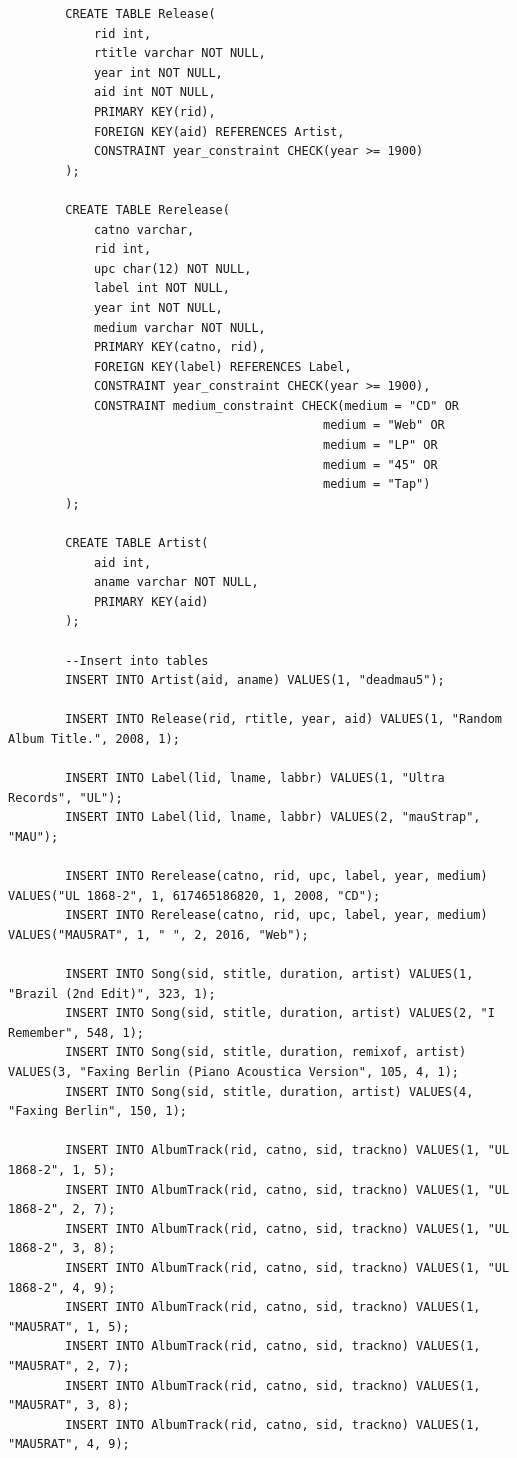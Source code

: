 \documentclass[12pt]{article}
\begin{document}
\begin{enumerate}
\begin{verbatim}
        CREATE TABLE Release(
            rid int, 
            rtitle varchar NOT NULL, 
            year int NOT NULL, 
            aid int NOT NULL,
            PRIMARY KEY(rid),
            FOREIGN KEY(aid) REFERENCES Artist,
            CONSTRAINT year_constraint CHECK(year >= 1900)
        );

        CREATE TABLE Rerelease(
            catno varchar, 
            rid int, 
            upc char(12) NOT NULL, 
            label int NOT NULL, 
            year int NOT NULL, 
            medium varchar NOT NULL,
            PRIMARY KEY(catno, rid),
            FOREIGN KEY(label) REFERENCES Label,
            CONSTRAINT year_constraint CHECK(year >= 1900),
            CONSTRAINT medium_constraint CHECK(medium = "CD" OR  
                                            medium = "Web" OR 
                                            medium = "LP" OR  
                                            medium = "45" OR 
                                            medium = "Tap")
        );

        CREATE TABLE Artist(
            aid int, 
            aname varchar NOT NULL,
            PRIMARY KEY(aid)
        );

        --Insert into tables
        INSERT INTO Artist(aid, aname) VALUES(1, "deadmau5");

        INSERT INTO Release(rid, rtitle, year, aid) VALUES(1, "Random Album Title.", 2008, 1);

        INSERT INTO Label(lid, lname, labbr) VALUES(1, "Ultra Records", "UL");
        INSERT INTO Label(lid, lname, labbr) VALUES(2, "mauStrap", "MAU");

        INSERT INTO Rerelease(catno, rid, upc, label, year, medium) VALUES("UL 1868-2", 1, 617465186820, 1, 2008, "CD");
        INSERT INTO Rerelease(catno, rid, upc, label, year, medium) VALUES("MAU5RAT", 1, " ", 2, 2016, "Web");

        INSERT INTO Song(sid, stitle, duration, artist) VALUES(1, "Brazil (2nd Edit)", 323, 1);
        INSERT INTO Song(sid, stitle, duration, artist) VALUES(2, "I Remember", 548, 1);
        INSERT INTO Song(sid, stitle, duration, remixof, artist) VALUES(3, "Faxing Berlin (Piano Acoustica Version", 105, 4, 1);
        INSERT INTO Song(sid, stitle, duration, artist) VALUES(4, "Faxing Berlin", 150, 1);

        INSERT INTO AlbumTrack(rid, catno, sid, trackno) VALUES(1, "UL 1868-2", 1, 5);
        INSERT INTO AlbumTrack(rid, catno, sid, trackno) VALUES(1, "UL 1868-2", 2, 7);
        INSERT INTO AlbumTrack(rid, catno, sid, trackno) VALUES(1, "UL 1868-2", 3, 8);
        INSERT INTO AlbumTrack(rid, catno, sid, trackno) VALUES(1, "UL 1868-2", 4, 9);
        INSERT INTO AlbumTrack(rid, catno, sid, trackno) VALUES(1, "MAU5RAT", 1, 5);
        INSERT INTO AlbumTrack(rid, catno, sid, trackno) VALUES(1, "MAU5RAT", 2, 7);
        INSERT INTO AlbumTrack(rid, catno, sid, trackno) VALUES(1, "MAU5RAT", 3, 8);
        INSERT INTO AlbumTrack(rid, catno, sid, trackno) VALUES(1, "MAU5RAT", 4, 9);


\end{verbatim}
\end{enumerate}
\end{document}
